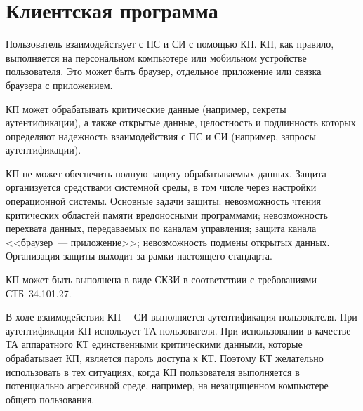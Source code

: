 \section{Клиентская программа}\label{COMMON.CP}

Пользователь взаимодействует с ПС и СИ с помощью КП.
КП, как правило, выполняется на персональном компьютере или мобильном 
устройстве пользователя. Это может быть браузер, отдельное приложение или 
связка браузера с приложением.  

КП может обрабатывать критические данные
(например, секреты аутентификации), а также открытые данные, 
целостность и подлинность которых определяют надежность  
взаимодействия с ПС и СИ (например, запросы аутентификации).

КП не может обеспечить полную защиту обрабатываемых данных. Защита организуется
средствами системной среды, в том числе через настройки операционной системы.
%
Основные задачи защиты: 
невозможность чтения критических областей памяти вредоносными программами;
невозможность перехвата данных, передаваемых по каналам управления; 
защита канала <<браузер~--- приложение>>; 
невозможность подмены открытых данных.
%
Организация защиты выходит за рамки настоящего стандарта.

КП может быть выполнена в виде СКЗИ в соответствии с требованиями 
СТБ~34.101.27.

В ходе взаимодействия КП~-- СИ выполняется аутентификация пользователя.
При аутентификации КП использует ТА пользователя. 
%
При использовании в качестве ТА аппаратного КТ единственными критическими
данными, которые обрабатывает КП, является пароль доступа к КТ. Поэтому КТ
желательно использовать в тех ситуациях, когда КП пользователя выполняется в
потенциально агрессивной среде, например, на незащищенном компьютере общего
пользования.
